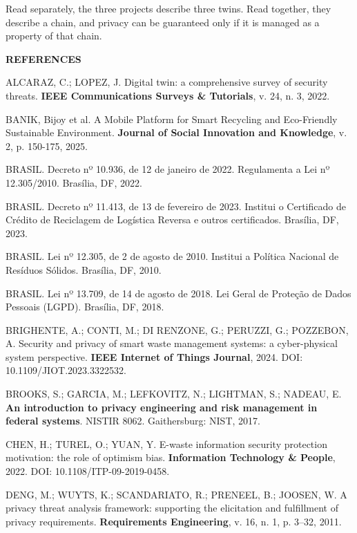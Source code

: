 \documentclass[12pt,a4paper,article,oneside,brazil,english]{abntex2}
\begin{document}
Read separately, the three projects describe three twins. Read together, they describe a chain, and privacy can be guaranteed only if it is managed as a property of that chain.

\begin{center}
\textbf{REFERENCES}
\end{center}

\begingroup
\SingleSpacing
\setlength{\parindent}{0pt}
\setlength{\parskip}{12pt}
\raggedright

ALCARAZ, C.; LOPEZ, J. Digital twin: a comprehensive survey of security threats. \textbf{IEEE Communications Surveys \& Tutorials}, v. 24, n. 3, 2022.

BANIK, Bijoy et al. A Mobile Platform for Smart Recycling and Eco-Friendly Sustainable Environment. \textbf{Journal of Social Innovation and Knowledge}, v. 2, p. 150-175, 2025.

BRASIL. Decreto nº 10.936, de 12 de janeiro de 2022. Regulamenta a Lei nº 12.305/2010. Brasília, DF, 2022.

BRASIL. Decreto nº 11.413, de 13 de fevereiro de 2023. Institui o Certificado de Crédito de Reciclagem de Logística Reversa e outros certificados. Brasília, DF, 2023.

BRASIL. Lei nº 12.305, de 2 de agosto de 2010. Institui a Política Nacional de Resíduos Sólidos. Brasília, DF, 2010.

BRASIL. Lei nº 13.709, de 14 de agosto de 2018. Lei Geral de Proteção de Dados Pessoais (LGPD). Brasília, DF, 2018.

BRIGHENTE, A.; CONTI, M.; DI RENZONE, G.; PERUZZI, G.; POZZEBON, A. Security and privacy of smart waste management systems: a cyber-physical system perspective. \textbf{IEEE Internet of Things Journal}, 2024. DOI: 10.1109/JIOT.2023.3322532.

BROOKS, S.; GARCIA, M.; LEFKOVITZ, N.; LIGHTMAN, S.; NADEAU, E. \textbf{An introduction to privacy engineering and risk management in federal systems}. NISTIR 8062. Gaithersburg: NIST, 2017.

CHEN, H.; TUREL, O.; YUAN, Y. E-waste information security protection motivation: the role of optimism bias. \textbf{Information Technology \& People}, 2022. DOI: 10.1108/ITP-09-2019-0458.

DENG, M.; WUYTS, K.; SCANDARIATO, R.; PRENEEL, B.; JOOSEN, W. A privacy threat analysis framework: supporting the elicitation and fulfillment of privacy requirements. \textbf{Requirements Engineering}, v. 16, n. 1, p. 3--32, 2011.
\end{document}
